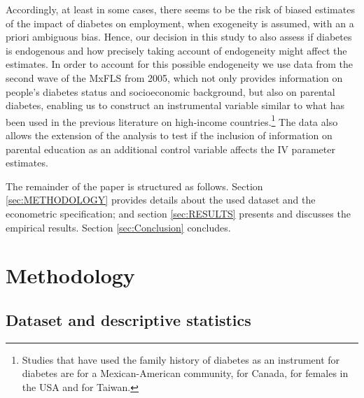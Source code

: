 Accordingly, at least in some cases, there seems to be the
risk of biased estimates of the impact of diabetes on employment,
when exogeneity is assumed, with an a priori ambiguous bias. Hence,
our decision in this study to also assess if diabetes is endogenous
and how precisely taking account of endogeneity might affect the estimates.
  In order to account for this possible endogeneity we use data from
the second wave of the \acf{MxFLS} from 2005, which not only provides
information on people\textquoteright s diabetes status and socioeconomic
background, but also on parental diabetes, enabling us to construct
an instrumental variable similar to what has been used in the previous
literature on high-income countries.\footnote{Studies that have used the family history of diabetes as an instrument
for diabetes are \textcite{Brown2005} for a Mexican-American community,
\textcite{Latif2009} for Canada, \textcite{Minor2010a} for females in
the USA and \textcite{Lin2011b} for Taiwan.} The data also allows the extension of the analysis to test if the
inclusion of information on parental education as an additional control
variable affects the \ac{IV} parameter estimates.

The remainder of the paper is structured as follows. Section
\ref{sec:METHODOLOGY} provides details about the used dataset and
the econometric specification; and section \ref{sec:RESULTS} presents
and discusses the empirical results. Section \ref{sec:Conclusion}
concludes.



\section{\label{sec:METHODOLOGY}Methodology}


\subsection{\label{sub:Data}Dataset and descriptive statistics}

